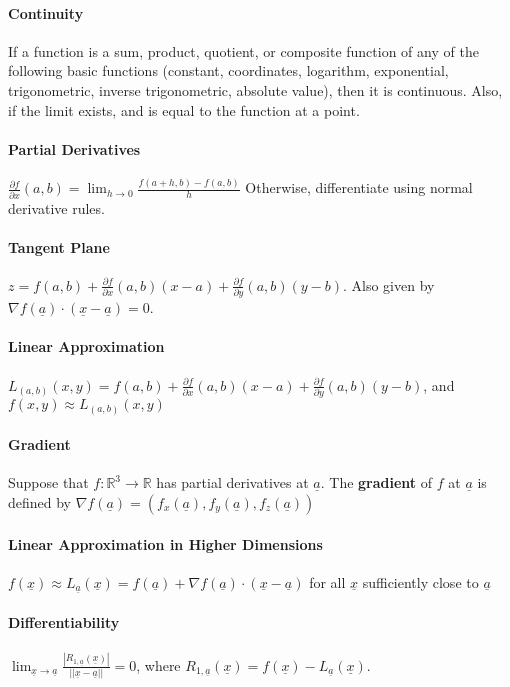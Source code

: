 \documentclass[10pt,letter]{article}
\theoremstyle{plain}
\theoremstyle{definition}
\begin{document}
\paragraph{Continuity} If a function is a sum, product, quotient, or composite function of any of the following basic functions (constant, coordinates, logarithm, exponential, trigonometric, inverse trigonometric, absolute value), then it is continuous. Also, if the limit exists, and is equal to the function at a point. 
\paragraph{Partial Derivatives} $\frac{\partial f}{\partial x}(a,b)=\lim_{h\rightarrow0}\frac{f(a+h,b)-f(a,b)}{h}$ Otherwise, differentiate using normal derivative rules. 
\paragraph{Tangent Plane}$z=f(a,b)+\frac{\partial f}{\partial x}(a,b)(x-a)+\frac{\partial f}{\partial y}(a,b)(y-b)$. Also given by $\nabla f(\underline{a})\cdot(\underline{x}-\underline{a})=0$. 
\paragraph{Linear Approximation} $L_{(a,b)}(x,y)=f(a,b)+\frac{\partial f}{\partial x}(a,b)(x-a)+\frac{\partial f}{\partial y}(a,b)(y-b)$, and $f(x,y)\approx L_{(a,b)}(x,y)$ 
\paragraph{Gradient} Suppose that $f:\mathbb{R}^3\rightarrow\mathbb{R}$ has partial derivatives at $\underline{a}$. The \textbf{gradient} of $f$ at $\underline{a}$ is defined by $\nabla f(\underline{a})=(f_x(\underline{a}),f_y(\underline{a}),f_z(\underline{a}))$ 
\paragraph{Linear Approximation in Higher Dimensions} $f(\underline{x})\approx L_{\underline{a}}(\underline{x})=f(\underline{a})+\nabla f(\underline{a})\cdot(\underline{x}-\underline{a})$ for all $\underline{x}$ sufficiently close to $\underline{a}$ 
\paragraph{Differentiability} $\lim_{\underline{x}\rightarrow\underline{a}}\frac{|R_{1,\underline{a}}(\underline{x})|}{||\underline{x}-\underline{a}||}=0$, where $R_{1,\underline{a}}(\underline{x})=f(\underline{x})-L_{\underline{a}}(\underline{x})$.
\end{document}
